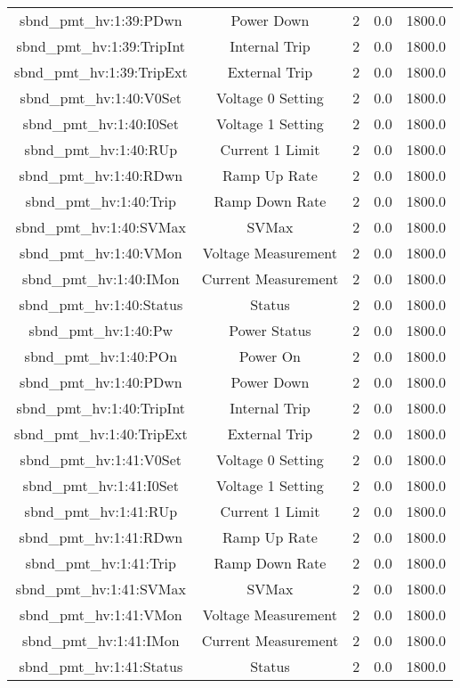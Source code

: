 \begin{center}
\begin{longtable}{c | c c c c }
sbnd\_pmt\_hv:1:39:PDwn & Power Down & 2 & 0.0 & 1800.0\\ 
sbnd\_pmt\_hv:1:39:TripInt & Internal Trip & 2 & 0.0 & 1800.0\\ 
sbnd\_pmt\_hv:1:39:TripExt & External Trip & 2 & 0.0 & 1800.0\\ 
sbnd\_pmt\_hv:1:40:V0Set & Voltage 0 Setting & 2 & 0.0 & 1800.0\\ 
sbnd\_pmt\_hv:1:40:I0Set & Voltage 1 Setting & 2 & 0.0 & 1800.0\\ 
sbnd\_pmt\_hv:1:40:RUp & Current 1 Limit & 2 & 0.0 & 1800.0\\ 
sbnd\_pmt\_hv:1:40:RDwn & Ramp Up Rate & 2 & 0.0 & 1800.0\\ 
sbnd\_pmt\_hv:1:40:Trip & Ramp Down Rate & 2 & 0.0 & 1800.0\\ 
sbnd\_pmt\_hv:1:40:SVMax & SVMax & 2 & 0.0 & 1800.0\\ 
sbnd\_pmt\_hv:1:40:VMon & Voltage Measurement & 2 & 0.0 & 1800.0\\ 
sbnd\_pmt\_hv:1:40:IMon & Current Measurement & 2 & 0.0 & 1800.0\\ 
sbnd\_pmt\_hv:1:40:Status & Status & 2 & 0.0 & 1800.0\\ 
sbnd\_pmt\_hv:1:40:Pw & Power Status & 2 & 0.0 & 1800.0\\ 
sbnd\_pmt\_hv:1:40:POn & Power On & 2 & 0.0 & 1800.0\\ 
sbnd\_pmt\_hv:1:40:PDwn & Power Down & 2 & 0.0 & 1800.0\\ 
sbnd\_pmt\_hv:1:40:TripInt & Internal Trip & 2 & 0.0 & 1800.0\\ 
sbnd\_pmt\_hv:1:40:TripExt & External Trip & 2 & 0.0 & 1800.0\\ 
sbnd\_pmt\_hv:1:41:V0Set & Voltage 0 Setting & 2 & 0.0 & 1800.0\\ 
sbnd\_pmt\_hv:1:41:I0Set & Voltage 1 Setting & 2 & 0.0 & 1800.0\\ 
sbnd\_pmt\_hv:1:41:RUp & Current 1 Limit & 2 & 0.0 & 1800.0\\ 
sbnd\_pmt\_hv:1:41:RDwn & Ramp Up Rate & 2 & 0.0 & 1800.0\\ 
sbnd\_pmt\_hv:1:41:Trip & Ramp Down Rate & 2 & 0.0 & 1800.0\\ 
sbnd\_pmt\_hv:1:41:SVMax & SVMax & 2 & 0.0 & 1800.0\\ 
sbnd\_pmt\_hv:1:41:VMon & Voltage Measurement & 2 & 0.0 & 1800.0\\ 
sbnd\_pmt\_hv:1:41:IMon & Current Measurement & 2 & 0.0 & 1800.0\\ 
sbnd\_pmt\_hv:1:41:Status & Status & 2 & 0.0 & 1800.0\\ 

\end{longtable}
\end{center}
